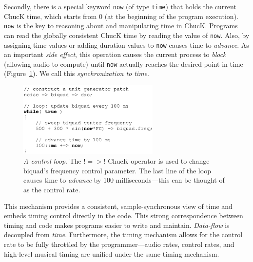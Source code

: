 Secondly, there is a special keyword \verb!now! (of type \verb!time!) that holds the current ChucK time, which starts from 0 (at the beginning of the program execution).  \verb!now! is the key to reasoning about and manipulating time in ChucK.  Programs can read the globally consistent ChucK time by reading the value of \verb!now!.  Also, by assigning time values or adding duration values to \verb!now! causes time to \textit{advance}.  As an important \textit{side effect}, this operation causes the current process to \textit{block} (allowing audio to compute) until \verb!now! actually reaches the desired point in time (Figure~\ref{Wang:img-3}).  We call this \textit{synchronization to time}.

%

\begin{figure}[t]
\centering
\includegraphics[width=70mm]{fig3.png}
\caption{\textit{A control loop}.  The $!=>!$ ChucK operator is used to change biquad's frequency control parameter.  The last line of the loop causes time to \textit{advance} by 100 milliseconds---this can be thought of as the control rate.}
\label{Wang:img-3}
\end{figure}




This mechanism provides a consistent, sample-synchronous view of time and embeds
timing control directly in the code.  This strong correspondence between timing
and code makes programs easier to write and maintain.  \textit{Data-flow} is
decoupled from\textit{ time}.  Furthermore, the timing mechanism allows for the
control rate to be fully throttled by the programmer---audio rates, control
rates, and high-level musical timing are unified under the same timing mechanism.


